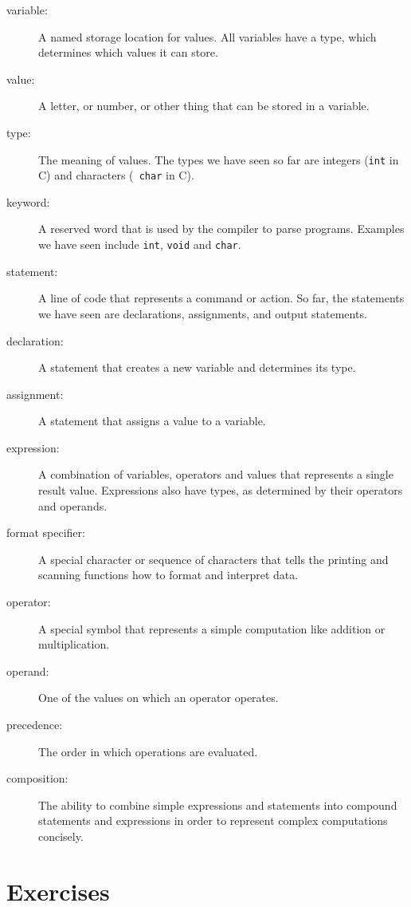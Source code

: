 \begin{description}

\item[variable:] A named storage location for values.  All
variables have a type, which determines which values it can
store.

\item[value:] A letter, or number, or other thing that can be
stored in a variable.  

\item[type:] The meaning of values.  The types
we have seen so far are integers ({\tt int} in C) and characters ({\tt
char} in C).

\item[keyword:]  A reserved word that is used by the compiler
to parse programs.  Examples we have seen include {\tt int},
{\tt void} and {\tt char}.

\item[statement:] A line of code that represents a command or
action.  So far, the statements we have seen are declarations,
assignments, and output statements.

\item[declaration:] A statement that creates a new variable and
determines its type.

\item[assignment:] A statement that assigns a value to a variable.

\item[expression:] A combination of variables, operators and
values that represents a single result value.  Expressions also
have types, as determined by their operators and operands.

\item[format specifier:] A special character or sequence of characters that tells the printing and scanning functions how to format and interpret data.

\item[operator:] A special symbol that represents a simple
computation like addition or multiplication.

\item[operand:] One of the values on which an operator operates. 

\item[precedence:] The order in which operations are evaluated.

\item[composition:] The ability to combine simple
expressions and statements into compound statements and expressions
in order to represent complex computations concisely.



\end{description}


\section{Exercises}
\setcounter{exercisenum}{0}






